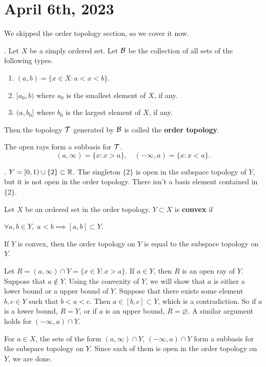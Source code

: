 \section*{April 6th, 2023}

We skipped the order topology section, so we cover it now.

.  Let \(X\) be a simply ordered set. Let \(\mathcal{B}\) be the collection of all sets of the following types.
\begin{enumerate}
    \item \((a, b) = \{x \in X : a < x < b\}\).
    \item \([a_0, b)\) where \(a_0\) is the smallest element of \(X\), if any.
    \item \((a, b_0]\) where \(b_0\) is the largest element of \(X\), if any.
\end{enumerate}
Then the topology \(\mathcal{T}\) generated by \(\mathcal{B}\) is called the \textbf{order topology}.

\rmk The open rays form a subbasis for \(\mathcal{T}\).
\[
    (a, \infty) = \{x : x > a\}, \quad (-\infty, a) = \{x : x < a\}.
\]

\ex. \(Y = [0, 1) \cup \{2\} \subset \mathbb{R}\). The singleton \(\{2\}\) is open in the subspace topology of \(Y\), but it is not open in the order topology. There isn't a basis element contained in \(\{2\}\).

 Let \(X\) be an ordered set in the order topology. \(Y \subset X\) is \textbf{convex} if
\begin{center}
    \(\forall a, b \in Y,\; a < b \implies [a, b] \subset Y\).
\end{center}
If \(Y\) is convex, then the order topology on \(Y\) is equal to the subspace topology on \(Y\).

\pf Let \(R = (a, \infty) \cap Y = \{x \in Y : x > a\}\). If \(a \in Y\), then \(R\) is an open ray of \(Y\). Suppose that \(a \notin Y\). Using the convexity of \(Y\), we will show that \(a\) is either a lower bound or a upper bound of \(Y\). Suppose that there exists some element \(b, c \in Y\) such that \(b < a < c\). Then \(a \in [b, c] \subset Y\), which is a contradiction. So if \(a\) is a lower bound, \(R = Y\), or if \(a\) is an upper bound, \(R = \varnothing\). A similar argument holds for \((-\infty, a) \cap Y\).

\note{\(\supset\)} For \(a \in X\), the sets of the form \((a, \infty) \cap Y\), \((-\infty, a) \cap Y\) form a subbasis for the subspace topology on \(Y\). Since each of them is open in the order topology on \(Y\), we are done.

